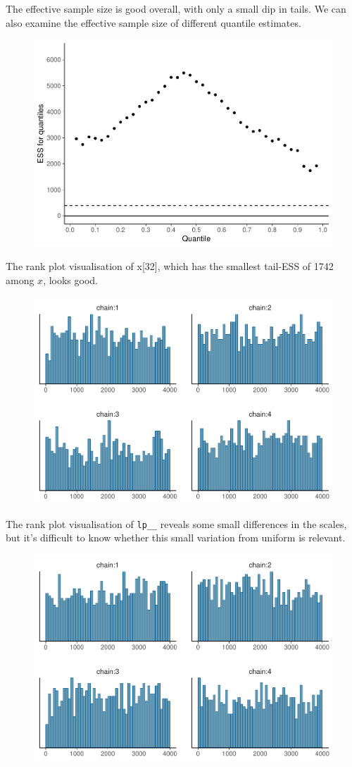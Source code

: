\documentclass[american,]{article}
\begin{document}
The effective sample size is good overall, with only a small dip in
tails. We can also examine the effective sample size of different
quantile estimates.

\begin{figure}[t]
  \centering
  \includegraphics[width=0.6\linewidth]{graphics/quantile-ess-fit-half-nom-1.pdf}
\end{figure}

The rank plot visualisation of x{[}32{]}, which has the smallest
tail-ESS of 1742 among \(x\), looks good.

\begin{figure}[t]
  \centering
  \includegraphics[width=0.6\linewidth]{graphics/hist-fit-half-nom-1.pdf}
\end{figure}

The rank plot visualisation of \texttt{lp\_\_} reveals some small
differences in the scales, but it's difficult to know whether this small
variation from uniform is relevant.

\begin{figure}[t]
  \centering
  \includegraphics[width=0.6\linewidth]{graphics/hist-fit-half-nom-lp-1.pdf}
\end{figure}
\end{document}
